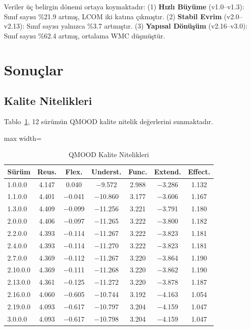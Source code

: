 \documentclass[conference]{IEEEtran}
\begin{document}
Veriler \"u\c{c} belirgin d\"onemi ortaya koymaktad{\i}r: (1) \textbf{H{\i}zl{\i} B\"uy\"ume} (v1.0--v1.3): S{\i}n{\i}f say{\i}s{\i} \%21.9 artm{\i}\c{s}, LCOM iki kat{\i}na \c{c}{\i}km{\i}\c{s}t{\i}r. (2) \textbf{Stabil Evrim} (v2.0--v2.13): S{\i}n{\i}f say{\i}s{\i} yaln{\i}zca \%3.7 artm{\i}\c{s}t{\i}r. (3) \textbf{Yap{\i}sal D\"on\"u\c{s}\"um} (v2.16--v3.0): S{\i}n{\i}f say{\i}s{\i} \%62.4 artm{\i}\c{s}, ortalama WMC d\"u\c{s}m\"u\c{s}t\"ur.

\section{Sonu\c{c}lar}

\subsection{Kalite Nitelikleri}
Tablo~\ref{tab:quality}, 12 s\"ur\"um\"un QMOOD kalite nitelik de\u{g}erlerini sunmaktad{\i}r.

\begin{table}[htbp]
\caption{QMOOD Kalite Nitelikleri}
\label{tab:quality}
\centering
\begin{adjustbox}{max width=\columnwidth}
\begin{tabular}{lcccccc}
\toprule
S\"ur\"um & Reus. & Flex. & Underst. & Func. & Extend. & Effect. \\
\midrule
1.0.0.0 & 4.147 & 0.040 & $-$9.572 & 2.988 & $-$3.286 & 1.132 \\
1.1.0.0 & 4.401 & $-$0.041 & $-$10.860 & 3.177 & $-$3.606 & 1.167 \\
1.3.0.0 & 4.409 & $-$0.099 & $-$11.256 & 3.221 & $-$3.791 & 1.180 \\
2.0.0.0 & 4.406 & $-$0.097 & $-$11.265 & 3.222 & $-$3.800 & 1.182 \\
2.2.0.0 & 4.393 & $-$0.114 & $-$11.267 & 3.222 & $-$3.823 & 1.181 \\
2.4.0.0 & 4.393 & $-$0.114 & $-$11.270 & 3.222 & $-$3.823 & 1.181 \\
2.7.0.0 & 4.369 & $-$0.112 & $-$11.267 & 3.220 & $-$3.864 & 1.190 \\
2.10.0.0 & 4.369 & $-$0.111 & $-$11.268 & 3.220 & $-$3.862 & 1.190 \\
2.13.0.0 & 4.361 & $-$0.125 & $-$11.272 & 3.220 & $-$3.878 & 1.187 \\
2.16.0.0 & 4.060 & $-$0.605 & $-$10.744 & 3.192 & $-$4.163 & 1.054 \\
2.19.0.0 & 4.093 & $-$0.617 & $-$10.797 & 3.204 & $-$4.159 & 1.047 \\
3.0.0.0 & 4.093 & $-$0.617 & $-$10.798 & 3.204 & $-$4.159 & 1.047 \\
\bottomrule
\end{tabular}
\end{adjustbox}
\end{table}
\end{document}
